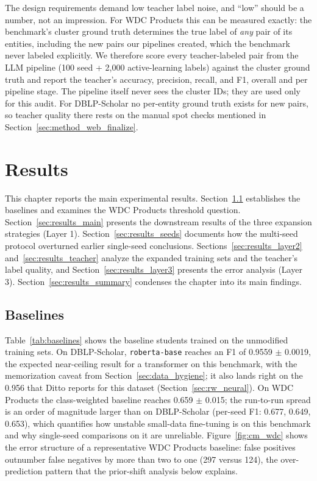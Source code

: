 \documentclass[a4paper,oneside,bibliography=totoc]{scrbook}
\begin{document}
The design requirements demand low teacher label noise, and ``low'' should be a number, not an impression. For WDC Products this can be measured exactly: the benchmark's cluster ground truth determines the true label of \emph{any} pair of its entities, including the new pairs our pipelines created, which the benchmark never labeled explicitly. We therefore score every teacher-labeled pair from the LLM pipeline (100 seed + 2{,}000 active-learning labels) against the cluster ground truth and report the teacher's accuracy, precision, recall, and F1, overall and per pipeline stage. The pipeline itself never sees the cluster IDs; they are used only for this audit. For DBLP-Scholar no per-entity ground truth exists for new pairs, so teacher quality there rests on the manual spot checks mentioned in Section~\ref{sec:method_web_finalize}.

\chapter{Results}
\label{ch:results}

This chapter reports the main experimental results. Section~\ref{sec:results_baseline} establishes the baselines and examines the WDC Products threshold question. Section~\ref{sec:results_main} presents the downstream results of the three expansion strategies (Layer 1). Section~\ref{sec:results_seeds} documents how the multi-seed protocol overturned earlier single-seed conclusions. Sections~\ref{sec:results_layer2} and~\ref{sec:results_teacher} analyze the expanded training sets and the teacher's label quality, and Section~\ref{sec:results_layer3} presents the error analysis (Layer 3). Section~\ref{sec:results_summary} condenses the chapter into its main findings.

\section{Baselines}
\label{sec:results_baseline}

Table~\ref{tab:baselines} shows the baseline students trained on the unmodified training sets. On DBLP-Scholar, \texttt{roberta-base} reaches an F1 of 0.9559 $\pm$ 0.0019, the expected near-ceiling result for a transformer on this benchmark, with the memorization caveat from Section~\ref{sec:data_hygiene}; it also lands right on the 0.956 that Ditto reports for this dataset \cite{li2020deep} (Section~\ref{sec:rw_neural}). On WDC Products the class-weighted baseline reaches 0.659 $\pm$ 0.015; the run-to-run spread is an order of magnitude larger than on DBLP-Scholar (per-seed F1: 0.677, 0.649, 0.653), which quantifies how unstable small-data fine-tuning is on this benchmark and why single-seed comparisons on it are unreliable. Figure~\ref{fig:cm_wdc} shows the error structure of a representative WDC Products baseline: false positives outnumber false negatives by more than two to one (297 versus 124), the over-prediction pattern that the prior-shift analysis below explains.
\end{document}
